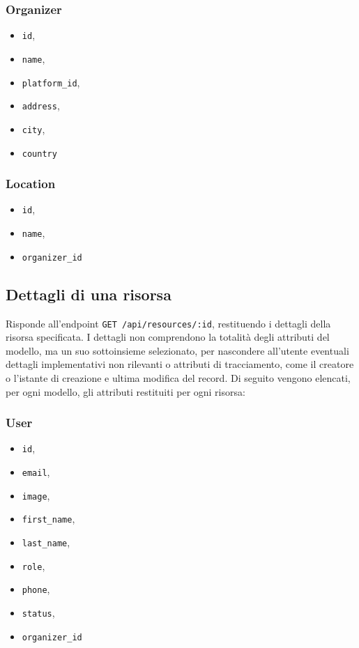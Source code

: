 \subsubsection{Organizer}
\begin{itemize}
	\item \verb|id|,
	\item \verb|name|,
	\item \verb|platform_id|,
	\item \verb|address|,
	\item \verb|city|,
	\item \verb|country|
\end{itemize}

\subsubsection{Location}
\begin{itemize}
	\item \verb|id|,
	\item \verb|name|,
	\item \verb|organizer_id|
\end{itemize}

\subsection{Dettagli di una risorsa} \label{api:dettaglio}
Risponde all'endpoint \verb|GET /api/resources/:id|, restituendo i dettagli della risorsa specificata. I dettagli non comprendono la totalità degli attributi del modello, ma un suo sottoinsieme selezionato, per nascondere all'utente eventuali dettagli implementativi non rilevanti o attributi di tracciamento, come il creatore o l'istante di creazione e ultima modifica del record. Di seguito vengono elencati, per ogni modello, gli attributi restituiti per ogni risorsa:

\subsubsection{User}
\begin{itemize}
	\item \verb|id|,
	\item \verb|email|,
	\item \verb|image|,
	\item \verb|first_name|,
	\item \verb|last_name|,
	\item \verb|role|,
	\item \verb|phone|,
	\item \verb|status|,
	\item \verb|organizer_id|
\end{itemize}

